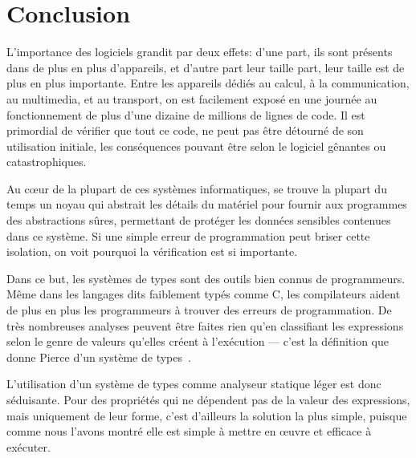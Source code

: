 



\section{Conclusion}

L'importance des logiciels grandit par deux effets:
d'une part, ils sont présents dans de plus en plus d'appareils,
et d'autre part leur taille part, leur taille est de plus en plus importante.
Entre les appareils dédiés au calcul, à la communication, au multimedia, et au
transport, on est facilement exposé en une journée au fonctionnement de plus
d'une dizaine de millions de lignes de code.
Il est primordial de vérifier que tout ce code, ne peut pas être détourné de son
utilisation initiale, les conséquences pouvant être selon le logiciel gênantes
ou catastrophiques.

Au cœur de la plupart de ces systèmes informatiques, se trouve la plupart du
temps un noyau qui abstrait les détails du matériel pour fournir aux programmes
des abstractions sûres, permettant de protéger les données sensibles contenues
dans ce système. Si une simple erreur de programmation peut briser cette
isolation, on voit pourquoi la vérification est si importante.

Dans ce but, les systèmes de types sont des outils bien connus de programmeurs.
Même dans les langages dits faiblement typés comme C, les compilateurs aident de
plus en plus les programmeurs à trouver des erreurs de programmation. De très
nombreuses analyses peuvent être faites rien qu'en classifiant les expressions
selon le genre de valeurs qu'elles créent à l'exécution --- c'est la définition
que donne Pierce d'un système de types~\cite[p.~1]{TAPL}.

L'utilisation d'un système de types comme analyseur statique léger est donc
séduisante. Pour des propriétés qui ne dépendent pas de la valeur des
expressions, mais uniquement de leur forme, c'est d'ailleurs la solution la plus
simple, puisque comme nous l'avons montré elle est simple à mettre en œuvre et
efficace à exécuter.

